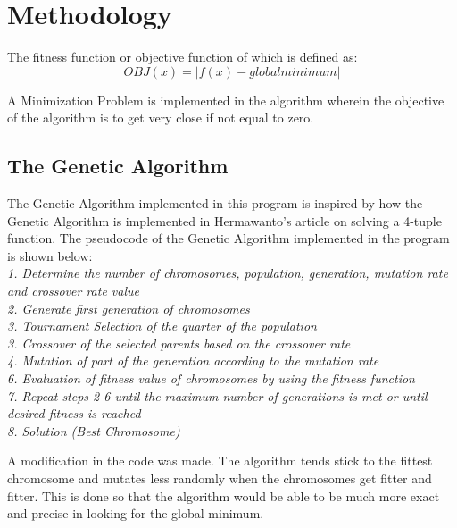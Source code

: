\documentclass{article}
\begin{document}
\section{Methodology}
The fitness function or objective function of which is defined as:
\begin{equation}
OBJ(x) = |f(x) - global minimum|
\end{equation}

A Minimization Problem is implemented in the algorithm wherein the objective of the algorithm is to get very close if not equal to zero.

\subsection{The Genetic Algorithm}
The Genetic Algorithm implemented in this program is inspired by how the Genetic Algorithm is implemented in Hermawanto's article on solving a 4-tuple function. The pseudocode of the Genetic Algorithm implemented in the program is shown below:\\
\textit{
1. Determine the number of chromosomes, population, generation, mutation rate and crossover rate value\\
2. Generate first generation of chromosomes\\
3. Tournament Selection of the quarter of the population\\
3. Crossover of the selected parents based on the crossover rate\\
4. Mutation of part of the generation according to the mutation rate\\
6. Evaluation of fitness value of chromosomes by using the fitness function\\
7. Repeat steps 2-6 until the maximum number of generations is met or until desired fitness is reached\\
8. Solution (Best Chromosome)\\
}

A modification in the code was made. The algorithm tends stick to the fittest chromosome and mutates less randomly when the chromosomes get fitter and fitter. This is done so that the algorithm would be able to be much more exact and precise in looking for the global minimum.
\end{document}
